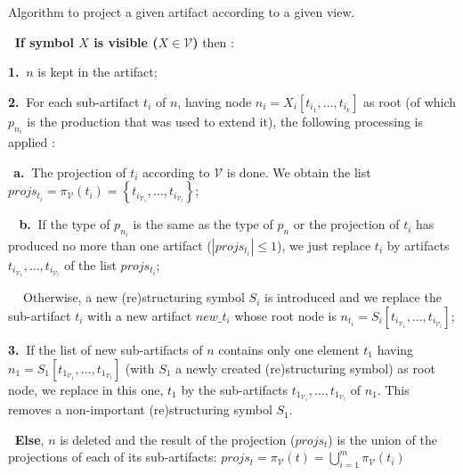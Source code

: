 \begin{algorithm}
\small
\caption{Algorithm to project a given artifact according to a given view.}
\label{chap3:algo:artifact-projection}
\begin{mdframed}[style=MyFrame]
	{\large\textbullet} $~$ \textbf{If symbol $X$ is visible ($X \in \mathcal{V}$)} then :
	
	\textbf{1.}$~$ $n$ is kept in the artifact;
	
	\textbf{2.}$~$ For each sub-artifact $t_i$ of $n$, having node $n_i=X_i\left[t_{i_1},\ldots,t_{i_k}\right]$ as root (of which $p_{n_i}$ is the production that was used to extend it), the following processing is applied :
	
	$~~$\textbf{a.}$~$ The projection of $t_i$ according to $\mathcal{V}$ is done. We obtain the list $\mathit{projs_{t_i}} = \pi_{\mathcal{V}}\left(t_i \right) = \left\{t_{i_{\mathcal{V}_1}},\ldots,t_{i_{\mathcal{V}_l}}\right\}$;
	
	$~~~~$\textbf{b.}$~$ If the type of $p_{n_i}$ is the same as the type of $p_{n}$ or the projection of $t_i$ has produced no more than one artifact ($\left|\mathit{projs_{t_i}}\right| \leq 1$), we just replace $t_i$ by artifacts $t_{i_{\mathcal{V}_1}},\ldots,t_{i_{\mathcal{V}_l}}$ of the list $\mathit{projs_{t_i}}$;
	
	$~~~~$ Otherwise, a new (re)structuring symbol $S_i$ is introduced and we replace the sub-artifact $t_i$ with a new artifact $new\_t_i$ whose root node is $n_{t_i}=S_i\left[t_{i_{\mathcal{V}_1}},\ldots,t_{i_{\mathcal{V}_l}}\right]$;
	
	\textbf{3.}$~$ If the list of new sub-artifacts of $n$ contains only one element $t_1$ having $n_1=S_1\left[t_{1_{\mathcal{V}_1}},\ldots,t_{1_{\mathcal{V}_l}}\right]$ (with $S_1$ a newly created (re)structuring symbol) as root node, we replace in this one, $t_1$ by the sub-artifacts $t_{1_{\mathcal{V}_1}},\ldots,t_{1_{\mathcal{V}_l}}$ of $n_1$. This removes a non-important (re)structuring symbol $S_1$.
	
	\noindent{\large\textbullet} $~$ \textbf{Else}, $n$ is deleted and the result of the projection ($\mathit{projs_t}$) is the union of the projections of each of its sub-artifacts: $\mathit{projs_t} = \pi_{\mathcal{V}}\left(t \right) = \bigcup^{m}_{i=1} \pi_{\mathcal{V}}\left(t_i \right)$
\end{mdframed}
\end{algorithm}

